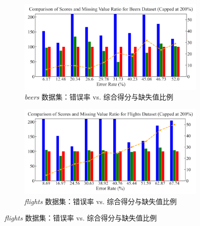 \documentclass[10pt]{article} %
\numberwithin{equation}{section}
\begin{document}
\begin{figure}[H]
  \centering
  \begin{subfigure}{0.49\linewidth} %
    \centering
    \includegraphics[width=\linewidth]{figures/beers_error.png} %
    \caption{\textit{beers} 数据集：错误率 vs. 综合得分与缺失值比例}
    \label{fig:beers_error}
  \end{subfigure}
  \hfill
  \begin{subfigure}{0.49\linewidth}
    \centering
    \includegraphics[width=\linewidth]{figures/flights_error.png}
    \caption{\textit{flights} 数据集：错误率 vs. 综合得分与缺失值比例}
    \label{fig:flights_error}
  \end{subfigure}

  \vspace{0.5em} %


\end{figure}
\end{document}
